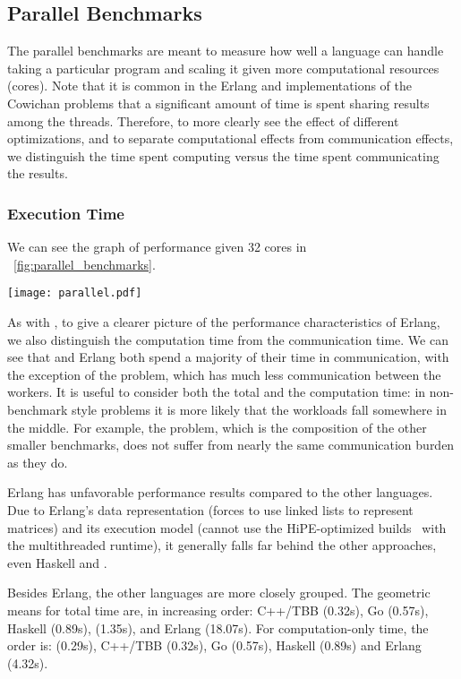 \subsection{Parallel Benchmarks}

The parallel benchmarks are meant to measure
how well a language can handle taking a particular
program and scaling it given more computational
resources (cores).
Note that it is common in the Erlang and {\qsname} implementations of the
Cowichan problems that a
significant amount of time is spent
sharing results among the threads.
Therefore, to more clearly see the effect of different optimizations,
and to separate computational effects from communication effects,
we distinguish the time spent computing versus the time spent
communicating the results.

\subsubsection{Execution Time}
We can see the graph of performance given 32 cores in
\fig~\ref{fig:parallel_benchmarks}.
\begin{figure*}[htb]
  \centering
  \texttt{[image: parallel.pdf]}
  \caption{Execution times of parallel tasks on different languages, executed on 32 cores}
  \label{fig:parallel_benchmarks}
\end{figure*}
As with {\qsname}, to give a clearer picture of
the performance characteristics of Erlang,
we also distinguish the computation
time from the communication time.
We can see that {\qsname} and Erlang both spend a majority
of their time in communication,
with the exception of the  problem, 
which has much less communication between the workers.
It is useful to consider both the total and the computation
time: in non-benchmark style problems it is more likely
that the workloads fall somewhere in the middle.
For example, the  problem, which is 
the composition of the other smaller benchmarks,
does not suffer from nearly the same communication
burden as they do.

Erlang has unfavorable performance results compared to
the other languages.
Due to Erlang's data representation
(forces to use linked lists to represent matrices)
and its execution model
(cannot use the HiPE-optimized builds~\cite{erlanghipe} with the multithreaded runtime),
it generally falls far behind the other approaches,
even Haskell and {\qsname}.

\begin{sloppypar}
Besides Erlang,
the other languages are more closely grouped.
The geometric means for total time are,
in increasing order:
C++/TBB (0.32s), Go (0.57s), Haskell (0.89s), {\qsname} (1.35s), 
and Erlang (18.07s).
For computation-only time, the order is:
{\qsname} (0.29s), C++/TBB (0.32s), Go (0.57s), Haskell (0.89s) and
Erlang (4.32s).
\end{sloppypar}

